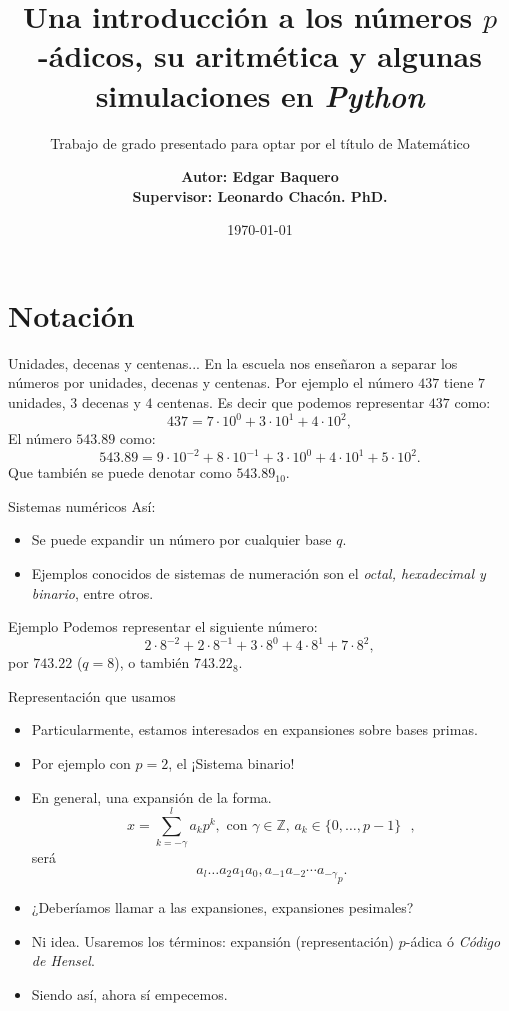 \documentclass{beamer}
\title{Una introducción a los números $p$-ádicos, su aritmética y algunas simulaciones en \textit{Python}}
\subtitle{Trabajo de grado presentado para optar por el título de
Matemático}
\date{\today}
\author{\bf{Autor: }Edgar Baquero 
	\\ \bf{Supervisor: }Leonardo Chacón. PhD.}
\institute{Pontificia Universidad Javeriana,
Facultad de Ciencias\\
Departamento de Matemáticas}
\theoremstyle{definition}
\numberwithin{equation}{section}
\newcommand{\tit}[1]{\textit{#1}}
\newcommand{\Z}{\mathbb{Z}}
\begin{document}
  \maketitle
  \section{Notación}
  \begin{frame}{Unidades, decenas y centenas...}
    En la escuela nos enseñaron a separar los números por unidades, decenas y centenas. Por ejemplo el número $437$ tiene $7$ unidades, $3$ decenas y $4$ centenas. Es decir que podemos representar $437$ como:
    $$437 = 7\cdot10^0+ 3\cdot 10^1 + 4\cdot 10^2,$$
    El número $543.89$ como:
    $$543.89 = 9\cdot10^{-2}+8\cdot10^{-1}+3\cdot10^0+4\cdot10^1+5\cdot10^2.$$
    Que también se puede denotar como $543.89_{10}$.
  \end{frame}

  \begin{frame}{Sistemas numéricos}
  	Así:
  	\begin{itemize}
  		\item Se puede expandir un número por cualquier base $q$.
 		\item Ejemplos conocidos de sistemas de numeración son el \tit{octal, hexadecimal y binario}, entre otros.
  	\end{itemize}
  \begin{exampleblock}{Ejemplo}
	Podemos representar el siguiente número:
	$$2\cdot8^{-2}+2\cdot8^{-1}+3\cdot8^0+4\cdot8^1+7\cdot8^2,$$
	por $743.22$ ($q=8$), o también $743.22_8$.
  \end{exampleblock}
	 
  \end{frame}

\begin{frame}{Representación que usamos}
	\begin{itemize}[<+- | alert@+>]
		\item Particularmente, estamos interesados en expansiones sobre bases primas.
		\item Por ejemplo con $p=2$, el ¡Sistema binario!
		\item En general, una expansión de la forma.	$$x=\sum_{k=-\gamma}^{l}a_kp^k,\text{ con $\gamma\in\Z$, $a_k\in \{0,\dots,p-1\}$ },$$
		será
		\begin{equation}\label{notacion}
		{a_{l} \ldots a_{2} a_{1} a_{0},a_{-1}a_{-2}\cdots a_{-\gamma}}_p.
		\end{equation}
		\item ¿Deberíamos llamar a las expansiones, expansiones pesimales?
		\item Ni idea. Usaremos los términos: expansión (representación) $p$-ádica ó \tit{Código de Hensel}.
		\item Siendo así, ahora sí empecemos.
	\end{itemize}

\end{frame}
\end{document}
